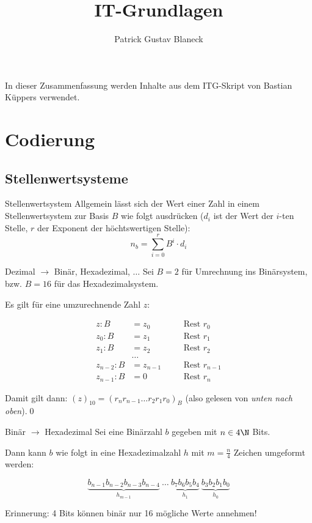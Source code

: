 \documentclass[german]{../spicker}
\title{IT-Grundlagen}
\author{Patrick Gustav Blaneck}
\begin{document}
\maketitle
In dieser Zusammenfassung werden Inhalte aus dem ITG-Skript von Bastian Küppers verwendet.
\tableofcontents
\newpage


\section{Codierung}
\subsection{Stellenwertsysteme}

\begin{defi}{Stellenwertsystem}
    Allgemein lässt sich der Wert einer Zahl in einem Stellenwertsystem zur Basis $B$ wie folgt ausdrücken ($d_i$ ist der Wert der $i$-ten Stelle, $r$ der Exponent der höchtswertigen Stelle):
    $$
        n_b = \sum^r_{i=0} B^i \cdot d_i
    $$
\end{defi}

\begin{algo}{Dezimal $\to$ Binär, Hexadezimal, $\ldots$}
    Sei $B = 2$ für Umrechnung ins Binärsystem, bzw. $B =16$ für das Hexadezimalsystem.

    Es gilt für eine umzurechnende Zahl $z$:

    $$
        \begin{aligned}
            z : B       & = z_0 \quad     &  & \text{Rest } r_0     \\
            z_0 : B     & = z_1 \quad     &  & \text{Rest } r_1     \\
            z_1 : B     & = z_2 \quad     &  & \text{Rest } r_2     \\
                        & \ldots          &  &                      \\
            z_{n-2} : B & = z_{n-1} \quad &  & \text{Rest } r_{n-1} \\
            z_{n-1} : B & = 0 \quad       &  & \text{Rest } r_n
        \end{aligned}
    $$

    Damit gilt dann: $(z)_{10} = (r_nr_{n-1}\ldots r_2r_1r_0)_B$ (also gelesen von \emph{unten nach oben}).\qed
\end{algo}

\begin{algo}{Binär $\to$ Hexadezimal}
    Sei eine Binärzahl $b$ gegeben mit $n \in 4\N$ Bits.

    Dann kann $b$ wie folgt in eine Hexadezimalzahl $h$ mit $m = \frac{n}{4}$ Zeichen umgeformt werden:

    $$
        \underbrace{b_{n-1}b_{n-2}b_{n-3}b_{n-4}}_{h_{m-1}} ~ \ldots ~ \underbrace{b_7b_6b_5b_4}_{h_1} ~ \underbrace{b_3b_2b_1b_0}_{h_0}
    $$

    Erinnerung: 4 Bits können binär nur 16 mögliche Werte annehmen!
\end{algo}
\end{document}
